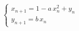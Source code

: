 \documentclass[preview,border=4pt]{standalone}
\begin{document}
\begin{equation}
\begin{cases}
x_{n+1} = 1 - a\, x_n^2 + y_n \\
y_{n+1} = b\, x_n
\end{cases}
\end{equation}
\end{document}
